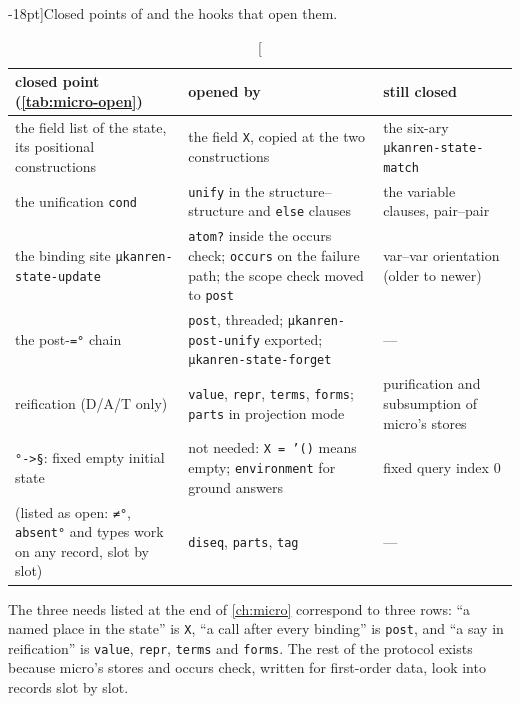 \begin{table}[ht]
\footnotesize
\caption[][-18pt]{Closed points of \micro{} and the hooks that open them.}
\label{tab:design-map}
\renewcommand{\arraystretch}{1.2}
\begin{tabularx}{\linewidth}{@{}>{\raggedright\arraybackslash}p{4.4cm}>{\raggedright\arraybackslash}X>{\raggedright\arraybackslash}p{4.2cm}@{}}
\toprule
closed point (\cref{tab:micro-open}) & opened by & still closed\\
\midrule
the field list of the state, its positional constructions & the field \texttt{X}, copied at the two constructions & the six-ary \texttt{μkanren-state-match}\\
the unification \texttt{cond} & \texttt{unify} in the structure--structure and \texttt{else} clauses & the variable clauses, pair--pair\\
the binding site \texttt{μkanren-state-update} & \texttt{atom?} inside the occurs check; \texttt{occurs} on the failure path; the scope check moved to \texttt{post} & var--var orientation (older to newer)\\
the post-\texttt{=°} chain & \texttt{post}, threaded; \texttt{μkanren-post-unify} exported; \texttt{μkanren-state-forget} & ---\\
reification (D/A/T only) & \texttt{value}, \texttt{repr}, \texttt{terms}, \texttt{forms}; \texttt{parts} in projection mode & purification and subsumption of micro's stores\\
\texttt{°->§}: fixed empty initial state & not needed: \texttt{X = '()} means empty; \texttt{environment} for ground answers & fixed query index 0\\
\midrule
(listed as open: \texttt{≠°}, \texttt{absent°} and types work on any record, slot by slot) & \texttt{diseq}, \texttt{parts}, \texttt{tag} & ---\\
\bottomrule
\end{tabularx}\par\vspace{28pt}%
\end{table}

The three needs listed at the end of \cref{ch:micro} correspond to three rows: \enquote{a named place in
the state} is \texttt{X}, \enquote{a call after every binding} is \texttt{post}, and \enquote{a say in
reification} is \texttt{value}, \texttt{repr}, \texttt{terms} and \texttt{forms}. The rest of the
protocol exists because micro's stores and occurs check, written for first-order data, look into records
slot by slot.

